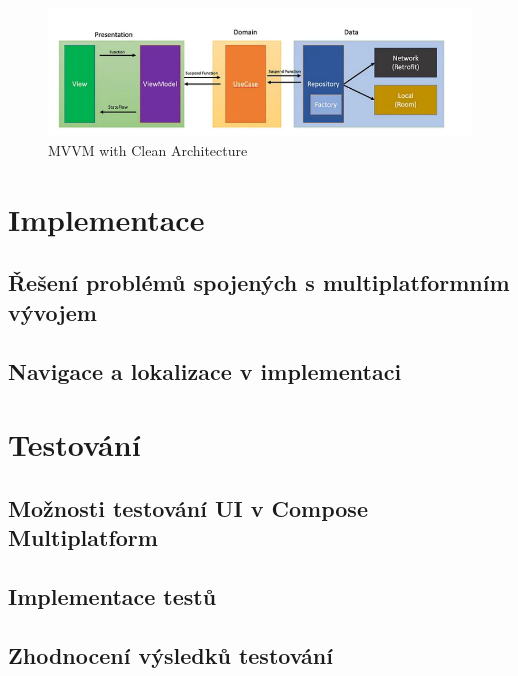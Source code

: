 \begin{figure}[H]
  \centering
  \includegraphics[width=1\textwidth]{mvvm.png}
  \caption{MVVM with Clean Architecture}
  \label{fig:mvvm}
\end{figure}





\chapter{Implementace}

\section{Řešení problémů spojených s multiplatformním vývojem}
\section{Navigace a lokalizace v implementaci}

\chapter{Testování}

\section{Možnosti testování UI v Compose Multiplatform}
\section{Implementace testů}
\section{Zhodnocení výsledků testování}

